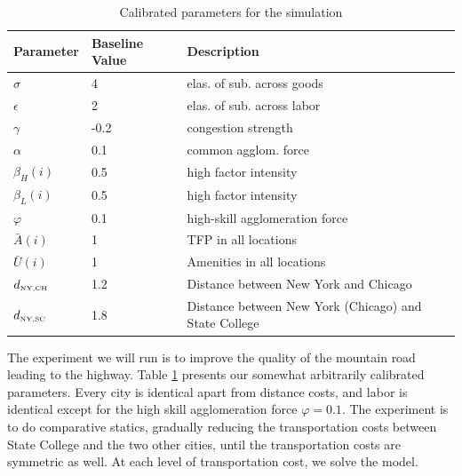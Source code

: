 \documentclass[12 pt]{article}
\begin{document}
\begin{table}
\centering
\begin{tabular}{lll}
\hline \hline
Parameter               & Baseline Value & Description                                           \\ \hline
$\sigma$                & 4              & elas. of sub. across goods                            \\
$\epsilon$              & 2              & elas. of sub. across labor                            \\
$\gamma$                & -0.2           & congestion strength                                   \\
$\alpha$                & 0.1            & common agglom. force                                  \\
$\beta_H(i)$            & 0.5            & high factor intensity                                 \\
$\beta_L(i)$            & 0.5            & high factor intensity                                 \\
$\varphi$               & 0.1            & high-skill agglomeration force                        \\
$\bar{A}(i)$            & 1              & TFP in all locations                                  \\
$\bar{U}(i)$            & 1              & Amenities in all locations                            \\
$d_{\tiny \mbox{NY,CH}}$ & 1.2            & Distance between New York and Chicago                 \\
$d_{\tiny \mbox{NY,SC}}$ & 1.8            & Distance between New York (Chicago) and State College \\
\hline
\end{tabular}
\caption{Calibrated parameters for the simulation}
\label{tab:cal_par}
\end{table}

The experiment we will run is to improve the quality of the mountain road leading to the highway.  Table \ref{tab:cal_par} presents our somewhat arbitrarily calibrated parameters.  Every city is identical apart from distance costs, and labor is identical except for the high skill agglomeration force $\varphi = 0.1$.  The experiment is to do comparative statics, gradually reducing the transportation costs between State College and the two other cities, until the transportation costs are symmetric as well.  At each level of transportation cost, we solve the model.
\end{document}
